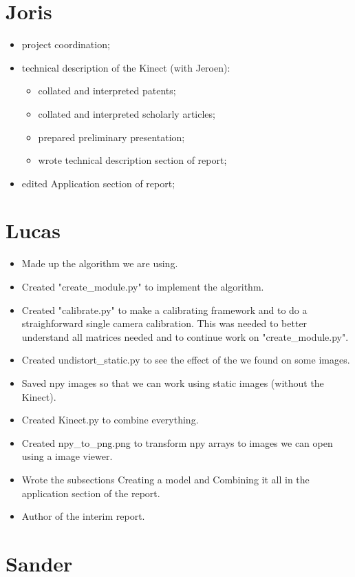 \section*{Joris}
\begin{itemize}
    \item project coordination;
    \item technical description of the Kinect (with Jeroen):
    \begin{itemize}
        \item collated and interpreted patents;
        \item collated and interpreted scholarly articles;
        \item prepared preliminary presentation;
        \item wrote technical description section of report;
    \end{itemize}
    \item edited Application section of report;
\end{itemize}


\section*{Lucas}
\begin{itemize}
\item Made up the algorithm we are using.
\item Created "create\_module.py" to implement the algorithm.
\item Created "calibrate.py" to make a calibrating framework and to do a 
straighforward single camera calibration. This was needed to better understand 
all matrices needed and to continue work on "create\_module.py".
\item Created undistort\_static.py to see the effect of the we found on some images.
\item Saved npy images so that we can work using static images (without the Kinect).
\item Created Kinect.py to combine everything.
\item Created npy\_to\_png.png to transform npy arrays to images we can open 
using a image viewer.
\item Wrote the subsections Creating a model and Combining it all in the 
application section of the report.
\item Author of the interim report.
\end{itemize}
\section*{Sander}
